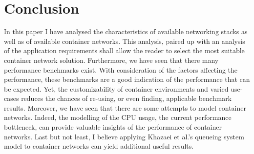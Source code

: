 \documentclass[conference]{IEEEtran}
\begin{document}
\section{Conclusion}
In this paper I have analysed the characteristics of available networking stacks as well as of available container networks. This analysis, paired up with an analysis of the application requirements shall allow the reader to select the most suitable container network solution. Furthermore, we have seen that there many performance benchmarks exist. With consideration of the factors affecting the performance, these benchmarks are a good indication of the performance that can be expected. Yet, the customizability of container environments and varied use-cases reduces the chances of re-using, or even finding, applicable benchmark results. Moreover, we have seen that there are some attempts to model container networks. Indeed, the modelling of the CPU usage, the current performance bottleneck, can provide valuable insights of the performance of container networks. Last but not least, I believe applying Khazaei et al.'s queueing system model to container networks can yield additional useful results.


\end{document}
